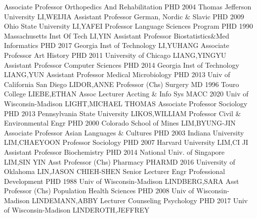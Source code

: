 \documentclass[
]{article}
\begin{document}
\textbar Associate Professor \textbar Orthopedics And Rehabilitation
\textbar PHD 2004 Thomas Jefferson University \textbar LI,WEIJIA
\textbar{}  \textbar Assistant Professor \textbar German,
Nordic \& Slavic \textbar PHD 2009 Ohio State University
\textbar LI,YAFEI \textbar{}  \textbar Professor
\textbar Language Sciences Program \textbar PHD 1990 Massachusetts Inst
Of Tech \textbar LI,YIN \textbar{}  \textbar Assistant
Professor \textbar Biostatistics\&Med Informatics \textbar PHD 2017
Georgia Inst of Technology \textbar LI,YUHANG \textbar{} 
\textbar Associate Professor \textbar Art History \textbar PHD 2011
University of Chicago \textbar LIANG,YINGYU \textbar{} 
\textbar Assistant Professor \textbar Computer Sciences \textbar PHD
2014 Georgia Inst of Technology \textbar LIANG,YUN \textbar{}
 \textbar Assistant Professor \textbar Medical Microbiology
\textbar PHD 2013 Univ of California San Diego \textbar LIDOR,ANNE
\textbar{}  \textbar Professor (Chs) \textbar Surgery
\textbar MD 1996 Touro College \textbar LIEBE,ETHAN \textbar{}
 \textbar Assoc Lecturer \textbar Accting \& Info Sys
\textbar MACC 2020 Univ of Wisconsin-Madison \textbar LIGHT,MICHAEL
THOMAS \textbar{}  \textbar Associate Professor
\textbar Sociology \textbar PHD 2013 Pennsylvania State University
\textbar LIKOS,WILLIAM \textbar{}  \textbar Professor
\textbar Civil \& Environmental Engr \textbar PHD 2000 Colorado School
of Mines \textbar LIM,BYUNG-JIN \textbar{} 
\textbar Associate Professor \textbar Asian Languages \& Cultures
\textbar PHD 2003 Indiana University \textbar LIM,CHAEYOON \textbar{}
 \textbar Professor \textbar Sociology \textbar PHD 2007
Harvard University \textbar LIM,CI JI \textbar{} 
\textbar Assistant Professor \textbar Biochemistry \textbar PHD 2014
National Univ. of Singapore \textbar LIM,SIN YIN \textbar{} 
\textbar Asst Professor (Chs) \textbar Pharmacy \textbar PHARMD 2016
University of Oklahoma \textbar LIN,JASON CHIEH-SHEN \textbar{}
 \textbar Senior Lecturer \textbar Engr Professional
Development \textbar PHD 1988 Univ of Wisconsin-Madison
\textbar LINDBERG,SARA \textbar{}  \textbar Asst Professor
(Chs) \textbar Population Health Sciences \textbar PHD 2008 Univ of
Wisconsin-Madison \textbar LINDEMANN,ABBY \textbar{} 
\textbar Lecturer \textbar Counseling Psychology \textbar PHD 2017 Univ
of Wisconsin-Madison \textbar LINDEROTH,JEFFREY \textbar{} 
\end{document}
